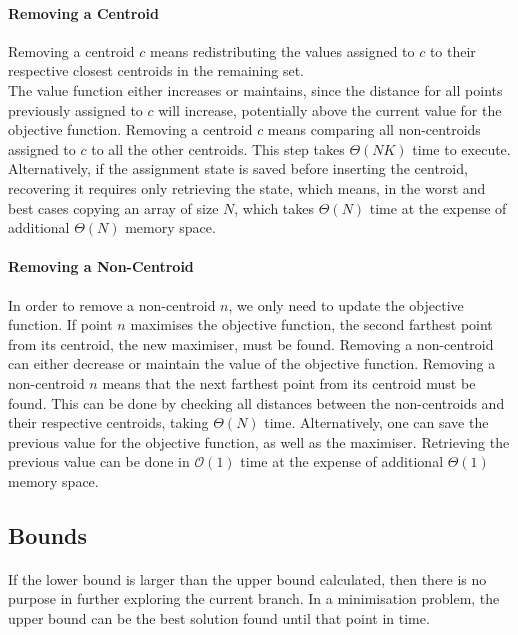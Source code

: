 \paragraph{Removing a Centroid}
Removing a centroid $c$ means redistributing the values assigned to $c$ to their respective closest centroids in the remaining set. \\
The value function either increases or maintains, since the distance for all points previously assigned to $c$ will increase, potentially above the current value for the objective function.
Removing a centroid $c$ means comparing all non-centroids assigned to $c$ to all the other centroids. This step takes $\Theta(NK)$ time to execute. Alternatively, if the assignment state is saved before inserting the centroid, recovering it requires only retrieving the state, which means, in the worst and best cases copying an array of size $N$, which takes $\Theta(N)$ time at the expense of additional $\Theta(N)$ memory space.

\paragraph{Removing a Non-Centroid}
In order to remove a non-centroid $n$, we only need to update the objective function. If point $n$ maximises the objective function, the second farthest point from its centroid, the new maximiser, must be found.
Removing a non-centroid can either decrease or maintain the value of the objective function.
Removing a non-centroid $n$ means that the next farthest point from its centroid must be found. This can be done by checking all distances between the non-centroids and their respective centroids, taking $\Theta(N)$ time. Alternatively, one can save the previous value for the objective function, as well as the maximiser. Retrieving the previous value can be done in $\mathcal{O}(1)$ time at the expense of additional $\Theta(1)$ memory space.
\subsection{Bounds}
\label{sec:bounds}
\paragraph{}
 If the lower bound is larger than the upper bound calculated, then there is no purpose in further exploring the current branch. In a minimisation problem, the upper bound can be the best solution found until that point in time.

